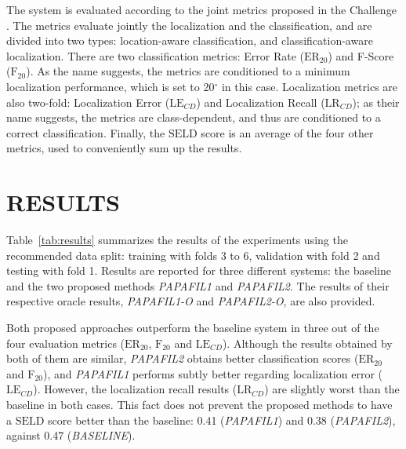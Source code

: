 The system is evaluated according to the joint metrics proposed in the Challenge \cite{Mesaros_2019_WASPAA}. 
The metrics evaluate jointly the localization and the classification, and are divided into two types: location-aware classification, and classification-aware localization. 
There are two classification metrics: Error Rate ($\text{ER}_{20}$) and F-Score ($\text{F}_{20}$). As the name suggests, the metrics are conditioned to a minimum localization performance, which is set to 20$^{\circ}$ in this case.
Localization metrics are also two-fold: Localization Error ($\text{LE}_{CD}$) and Localization Recall ($\text{LR}_{CD}$); 
as their name suggests, the metrics are class-dependent, and thus are conditioned to a correct classification.
Finally, the $\text{SELD}$ score is an average of the four other metrics, used to conveniently sum up the results. 




\section{RESULTS}
\label{sec:results}

Table~\ref{tab:results} summarizes the results of the experiments using the recommended data split: training with folds 3 to 6, validation with fold 2 and testing with fold 1. 
Results are reported for three different systems: the baseline and the two proposed methods \textit{PAPAFIL1} and \textit{PAPAFIL2}.
The results of their respective oracle results, \textit{PAPAFIL1-O} and \textit{PAPAFIL2-O}, are also provided. 

Both proposed approaches outperform the baseline system in three out of the four evaluation metrics ($\text{ER}_{20}$, $\text{F}_{20}$ and $\text{LE}_{CD}$). 
Although the results obtained by both of them are similar, \textit{PAPAFIL2} obtains better classification scores ($\text{ER}_{20}$ and $\text{F}_{20}$), and \textit{PAPAFIL1} performs subtly better regarding localization error ($\text{LE}_{CD}$).
However, the localization recall results ($\text{LR}_{CD}$) are slightly worst than the baseline in both cases. This fact does not prevent the proposed methods to have a $\text{SELD}$ score better than the baseline: 0.41 (\textit{PAPAFIL1}) and 0.38 (\textit{PAPAFIL2}), against 0.47 (\textit{BASELINE}).

